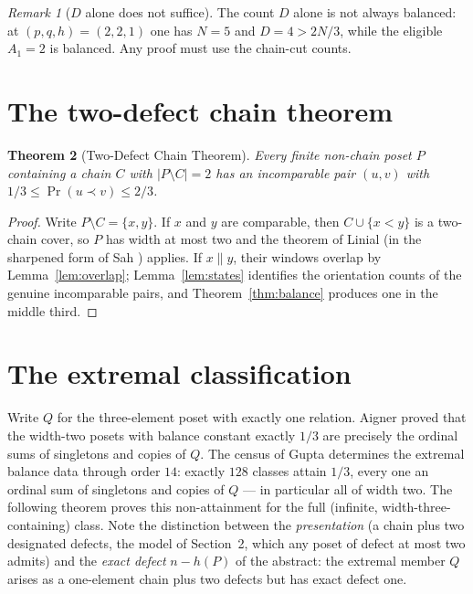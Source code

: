 \documentclass[11pt]{article}
\newtheorem{theorem}{Theorem}[section]
\theoremstyle{definition}
\theoremstyle{remark}
\newtheorem{remark}[theorem]{Remark}
\newcommand{\pr}{\operatorname{Pr}}
\begin{document}
\begin{remark}[$D$ alone does not suffice]
The count $D$ alone is not always balanced: at $(p,q,h)=(2,2,1)$ one has $N=5$ and
$D=4>2N/3$, while the eligible $A_1=2$ is balanced. Any proof must use the chain-cut
counts. %
\end{remark}

\section{The two-defect chain theorem}
\begin{theorem}[Two-Defect Chain Theorem]\label{thm:twodefect}
Every finite non-chain poset $P$ containing a chain $C$ with $|P\setminus C|=2$ has an
incomparable pair $(u,v)$ with $1/3\le\pr(u\prec v)\le 2/3$.
\end{theorem}

\begin{proof}
Write $P\setminus C=\{x,y\}$. If $x$ and $y$ are comparable, then $C\cup\{x<y\}$ is a
two-chain cover, so $P$ has width at most two and the theorem of Linial \cite{linial}
(in the sharpened form of Sah \cite{sah}) applies. If $x\parallel y$, their windows
overlap by Lemma~\ref{lem:overlap}; Lemma~\ref{lem:states} identifies the orientation
counts of the genuine incomparable pairs, and Theorem~\ref{thm:balance} produces one in
the middle third.
\end{proof}

\section{The extremal classification}
Write $Q$ for the three-element poset with exactly one relation. Aigner \cite{aigner}
proved that the width-two posets with balance constant exactly $1/3$ are precisely the
ordinal sums of singletons and copies of $Q$. The census of Gupta \cite{gupta}
determines the extremal balance data through order $14$: exactly $128$ classes attain
$1/3$, every one an ordinal sum of singletons and copies of $Q$ --- in particular all of
width two. The following theorem proves this non-attainment for the full (infinite,
width-three-containing) class. Note the distinction between the \emph{presentation}
(a chain plus two designated defects, the model of Section~2, which any poset of defect
at most two admits) and the \emph{exact defect} $n-h(P)$ of the abstract: the extremal
member $Q$ arises as a one-element chain plus two defects but has exact defect one.
\end{document}
